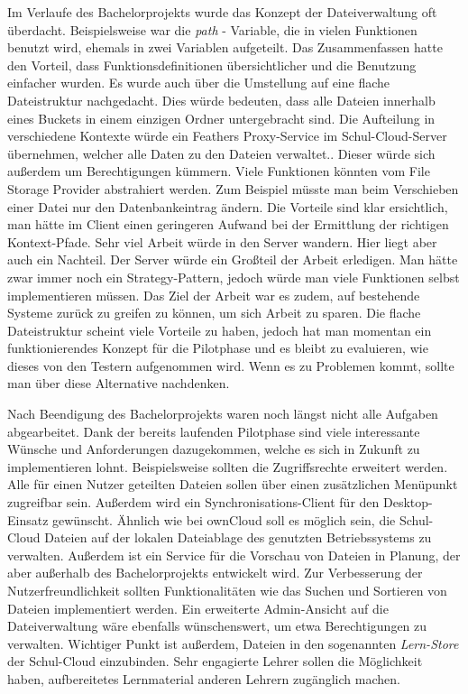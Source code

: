 Im Verlaufe des Bachelorprojekts wurde das Konzept der Dateiverwaltung oft überdacht. Beispielsweise war die \textit{path} - Variable, die in vielen Funktionen benutzt wird, ehemals in zwei Variablen aufgeteilt. Das Zusammenfassen hatte den Vorteil, dass Funktionsdefinitionen übersichtlicher und die Benutzung einfacher wurden. Es wurde auch über die Umstellung auf eine flache Dateistruktur nachgedacht. Dies würde bedeuten, dass alle Dateien innerhalb eines Buckets in einem einzigen Ordner untergebracht sind. Die Aufteilung in verschiedene Kontexte würde ein Feathers Proxy-Service im Schul-Cloud-Server übernehmen, welcher alle Daten zu den Dateien verwaltet.. Dieser würde sich außerdem um Berechtigungen kümmern. Viele Funktionen könnten vom File Storage Provider abstrahiert werden. Zum Beispiel müsste man beim Verschieben einer Datei nur den Datenbankeintrag ändern. Die Vorteile sind klar ersichtlich, man hätte im Client einen geringeren Aufwand bei der Ermittlung der richtigen Kontext-Pfade. Sehr viel Arbeit würde in den Server wandern. Hier liegt aber auch ein Nachteil. Der Server würde ein Großteil der Arbeit erledigen. Man hätte zwar immer noch ein Strategy-Pattern, jedoch würde man viele Funktionen selbst implementieren müssen. Das Ziel der Arbeit war es zudem, auf bestehende Systeme zurück zu greifen zu können, um sich Arbeit zu sparen. Die flache Dateistruktur scheint viele Vorteile zu haben, jedoch hat man momentan ein funktionierendes Konzept für die Pilotphase und es bleibt zu evaluieren, wie dieses von den Testern aufgenommen wird. Wenn es zu Problemen kommt, sollte man über diese Alternative nachdenken.

Nach Beendigung des Bachelorprojekts waren noch längst nicht alle Aufgaben abgearbeitet. Dank der bereits laufenden Pilotphase sind viele interessante Wünsche und Anforderungen dazugekommen, welche es sich in Zukunft zu implementieren lohnt. Beispielsweise sollten die Zugriffsrechte erweitert werden. Alle für einen Nutzer geteilten Dateien sollen über einen zusätzlichen Menüpunkt zugreifbar sein. Außerdem wird ein Synchronisations-Client für den Desktop-Einsatz gewünscht. Ähnlich wie bei ownCloud soll es möglich sein, die Schul-Cloud Dateien auf der lokalen Dateiablage des genutzten Betriebssystems zu verwalten. Außerdem ist ein Service für die Vorschau von Dateien in Planung, der aber außerhalb des Bachelorprojekts entwickelt wird. Zur Verbesserung der Nutzerfreundlichkeit sollten Funktionalitäten wie das Suchen und Sortieren von Dateien implementiert werden. Ein erweiterte Admin-Ansicht auf die Dateiverwaltung wäre ebenfalls wünschenswert, um etwa Berechtigungen zu verwalten. Wichtiger Punkt ist außerdem, Dateien in den sogenannten \textit{Lern-Store} \cite{online:zehnforderungen} der Schul-Cloud einzubinden. Sehr engagierte Lehrer sollen die Möglichkeit haben, aufbereitetes Lernmaterial anderen Lehrern zugänglich machen. 

\clearpage
